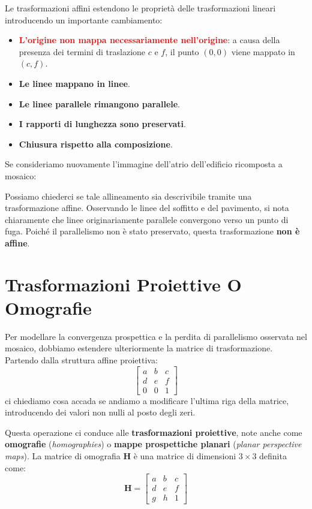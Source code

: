 ﻿\documentclass[11pt, a4paper]{article}
\begin{document}
Le trasformazioni affini estendono le proprietà delle trasformazioni lineari introducendo un importante cambiamento:
\begin{itemize}[noitemsep]
    \item \textbf{\textcolor{red}{L'origine non mappa necessariamente nell'origine}}: a causa della presenza dei termini di traslazione $c$ e $f$, il punto $(0,0)$ viene mappato in $(c,f)$.
    \item \textbf{Le linee mappano in linee}.
    \item \textbf{Le linee parallele rimangono parallele}.
    \item \textbf{I rapporti di lunghezza sono preservati}.
    \item \textbf{Chiusura rispetto alla composizione}.
\end{itemize}

Se consideriamo nuovamente l'immagine dell'atrio dell'edificio ricomposta a mosaico:


Possiamo chiederci se tale allineamento sia descrivibile tramite una trasformazione affine. Osservando le linee del soffitto e del pavimento, si nota chiaramente che linee originariamente parallele convergono verso un punto di fuga. Poiché il parallelismo non è stato preservato, questa trasformazione \textbf{non è affine}.

\newpage

\section{Trasformazioni Proiettive O Omografie}

Per modellare la convergenza prospettica e la perdita di parallelismo osservata nel mosaico, dobbiamo estendere ulteriormente la matrice di trasformazione. Partendo dalla struttura affine proiettiva:
\[
\begin{bmatrix} a & b & c \\ d & e & f \\ 0 & 0 & 1 \end{bmatrix}
\]
ci chiediamo cosa accada se andiamo a modificare l'ultima riga della matrice, introducendo dei valori non nulli al posto degli zeri.

Questa operazione ci conduce alle \textbf{trasformazioni proiettive}, note anche come \textbf{omografie} (\emph{homographies}) o \textbf{mappe prospettiche planari} (\emph{planar perspective maps}). La matrice di omografia $\bm{H}$ è una matrice di dimensioni $3 \times 3$ definita come:
\[
\bm{H} = \begin{bmatrix} a & b & c \\ d & e & f \\ g & h & 1 \end{bmatrix}
\]
\end{document}
